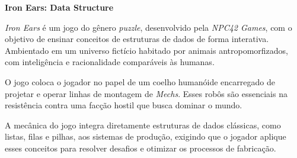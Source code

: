 \item \textbf{Iron Ears: Data Structure}

\textit{Iron Ears} é um jogo do gênero \textit{puzzle}, desenvolvido pela
\textit{NPC42 Games}, com o objetivo de ensinar conceitos de estruturas de
dados de forma interativa. Ambientado em um universo fictício habitado por
animais antropomorfizados, com inteligência e racionalidade comparáveis às
humanas.

O jogo coloca o jogador no papel de um coelho humanóide encarregado de
projetar e operar linhas de montagem de \textit{Mechs}. Esses robôs são
essenciais na resistência contra uma facção hostil que busca dominar o mundo.

A mecânica do jogo integra diretamente estruturas de dados clássicas, como
listas, filas e pilhas, aos sistemas de produção, exigindo que o jogador
aplique esses conceitos para resolver desafios e otimizar os processos de
fabricação. \cite{IronEarsItchio}


